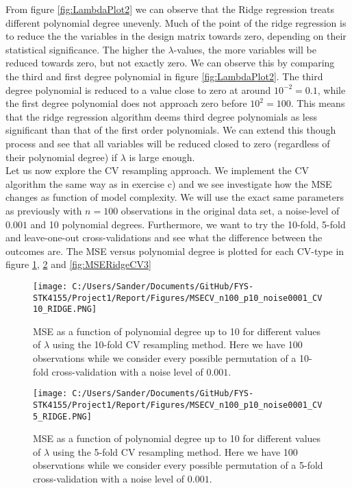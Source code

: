 \documentclass[12pt,a4paper]{article}
\begin{document}
\noindent From figure \ref{fig:LambdaPlot2} we can observe that the Ridge regression treats different polynomial degree unevenly. Much of the point of the ridge regression is to reduce the the variables in the design matrix towards zero, depending on their statistical significance. The higher the $\lambda$-values, the more variables will be reduced towards zero, but not exactly zero. We can observe this by comparing the third and first degree polynomial in figure \ref{fig:LambdaPlot2}. The third degree polynomial is reduced to a value close to zero at around $10^{-2} = 0.1$, while the first degree polynomial does not approach zero before $10^2 = 100$. This means that the ridge regression algorithm deems third degree polynomials as less significant than that of the first order polynomials. We can extend this though process and see that all variables will be reduced closed to zero (regardless of their polynomial degree) if $\lambda$ is large enough.
\\
Let us now explore the CV resampling approach. We implement the CV algorithm the same way as in exercise c) and we see investigate how the MSE changes as function of model complexity. We will use the exact same parameters as previously with $n = 100$ observations in the original data set, a noise-level of $0.001$ and 10 polynomial degrees. Furthermore, we want to try the 10-fold, 5-fold and leave-one-out cross-validations and see what the difference between the outcomes are. The MSE versus polynomial degree is plotted for each CV-type in figure \ref{fig:MSERidgeCV1}, \ref{fig:MSERidgeCV2} and \ref{fig:MSERidgeCV3}

\begin{figure}[H]
\centering
\texttt{[image: C:/Users/Sander/Documents/GitHub/FYS-STK4155/Project1/Report/Figures/MSECV\_n100\_p10\_noise0001\_CV10\_RIDGE.PNG]}
\caption{\label{fig:MSERidgeCV1} MSE as a function of polynomial degree up to 10 for different values of $\lambda$ using the 10-fold CV resampling method. Here we have 100 observations while we consider every possible permutation of a 10-fold cross-validation with a noise level of $0.001$.}
\end{figure}

\begin{figure}[H]
\centering
\texttt{[image: C:/Users/Sander/Documents/GitHub/FYS-STK4155/Project1/Report/Figures/MSECV\_n100\_p10\_noise0001\_CV5\_RIDGE.PNG]}
\caption{\label{fig:MSERidgeCV2} MSE as a function of polynomial degree up to 10 for different values of $\lambda$ using the 5-fold CV resampling method. Here we have 100 observations while we consider every possible permutation of a 5-fold cross-validation with a noise level of $0.001$.}
\end{figure}
\end{document}
